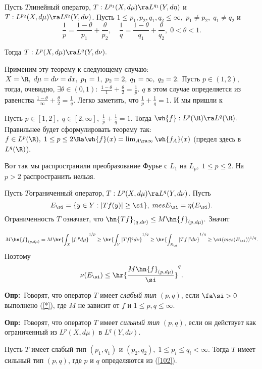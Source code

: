 \documentclass[a4paper]{article}
\def\defin{\noindent\textbf{Опр:}\ }
\begin{document}
\begin{theorems} Пусть $T$\т линейный оператор, $T:L^{p_1}(X,d\mu)\ra
L^{q_1}(Y,d\eta)$ и $T:L^{p_2}(X,d\mu)\ra L^{q_2}(Y,d\nu)$. Пусть $1\le
p_1,p_2,q_1,q_2\le\infty,\;p_1\neq p_2,\;q_1\neq q_2$ и
\begin{equation}\label{102}
\frac1p=\frac{1-\theta}{p_1}+\frac{\theta}{p_2},\quad
\frac1q=\frac{1-\theta}{q_1}+\frac{\theta}{q_2},\;0<\theta<1.
\end{equation}

Тогда $T:L^{p}(X,d\mu)\ra L^{q}(Y,d\nu).$
\end{theorems}

Применим эту теорему к следующему случаю: $X=\R ,\;d\mu=d\nu=dx,\;p_1=1,\;p_2=2,\;q_1=\infty,\;q_2=2.$
Пусть $p\in(1,2)$, тогда, очевидно, $\exi\theta\in(0,1):\;\frac{1-\theta}1+\frac{\theta}2=\frac1p.$ $q$ в
этом случае определяется из равенства $\frac{1-\theta}{\infty}+\frac{\theta}2=\frac1q.$ Легко заметить, что
$\frac1p+\frac1q=1.$ И мы пришли к
\begin{theorems}
Пусть $p\in[1,2],\;q\in[2,\infty],\;\frac1p+\frac1q=1$. Тогда $\wh{f}:L^p(\R )\ra
L^q(\R ).$ Правильнее будет сформулировать теорему так: $f\in L^p(\R ),\;1\le
p\le2\Ra \wh{f}(x)=\lim_{A\ra\infty} \wh{f_A}(x)$ (предел здесь в
$L^q(\R )$).
\end{theorems}

Вот так мы распространили преобразование Фурье с $L_1$ на $L_p,\;1\le p \le 2$. На $p>2$ распространить
нельзя.

Пусть $T$\т ограниченный оператор, $T:L^p(X,d\mu)\ra L^q(Y,d\nu)$. Пусть
$$E_{\si}=\{y\in Y:|Tf(y)|\ge\si\},\;mes E_{\si}=\eta(E_{\si}).$$ Ограниченность $T$ означает, что
$\hn{Tf}_{(q,d\nu)}\le M\hn{f}_{(p,d\mu)}.$ Значит

$$M\hn{f}_{(p,d\mu)}=M\hr{\int_X |f|^pd\mu}^{1/p}\ge \hr{\int_Y |Tf|^qd\nu}^{1/q}\ge
\hr{\int_{E_{\si}} |Tf|^qd\nu}^{1/q}\ge\si(mes(E_{\si}))^{1/q}.$$ Поэтому
\begin{equation}\label{*}
\nu(E_{\si})\le\hr{\frac{M\hn{f}_{(p,d\mu)}}{\si}}^q.
\end{equation}

\defin Говорят, что оператор $T$ имеет \emph{слабый тип} $(p,q)$, если $\fa\si>0$
выполнено (\ref{*}), где $M$ не зависит от $f$ и $1\le p,q\le\infty.$

\defin Говорят, что оператор $T$ имеет \emph{сильный тип} $(p,q)$, если он действует как
ограниченный из $L^p(X,d\mu)$ в $L^q(Y,d\nu).$

\begin{theorems}[Марцинкевич] Пусть $T$ имеет слабый тип
$(p_1,q_1)$ и $(p_2,q_2),\;1\le p_i\le q_i<\infty$. Тогда $T$ имеет сильный тип $(p,q)$, где $p$ и $q$
определяются из (\ref{102}).
\end{theorems}
\end{document}
